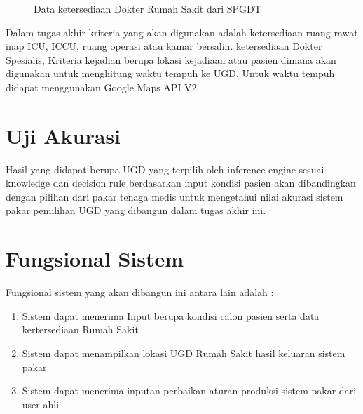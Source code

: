 \begin{figure}[h]	
	{\centering {}\par}
	\caption{Data ketersediaan Dokter Rumah Sakit dari SPGDT}
	\label{fig:dataDok}
\end{figure}

\par Dalam tugas akhir kriteria yang akan digunakan adalah ketersediaan ruang rawat inap ICU, ICCU, ruang operasi atau kamar bersalin. ketersediaan Dokter Spesialis, Kriteria kejadian berupa lokasi kejadiaan atau pasien dimana akan digunakan untuk menghitung waktu tempuh ke UGD. Untuk waktu tempuh didapat menggunakan Google Maps API V2.

\section{Uji Akurasi}
Hasil yang didapat berupa UGD yang terpilih oleh inference engine sesuai knowledge dan decision rule berdasarkan input kondisi pasien akan dibandingkan dengan pilihan dari pakar tenaga medis untuk mengetahui nilai akurasi sistem pakar pemilihan UGD yang dibangun dalam tugas akhir ini.

\section{Fungsional Sistem}
Fungsional sistem yang akan dibangun ini antara lain adalah :
\begin{enumerate}
	\item Sistem dapat menerima Input berupa kondisi calon pasien serta data kertersediaan Rumah Sakit
	\item Sistem dapat menampilkan lokasi UGD Rumah Sakit hasil keluaran sistem pakar
	\item Sistem dapat menerima inputan perbaikan aturan produksi sistem pakar dari user ahli
\end{enumerate}

